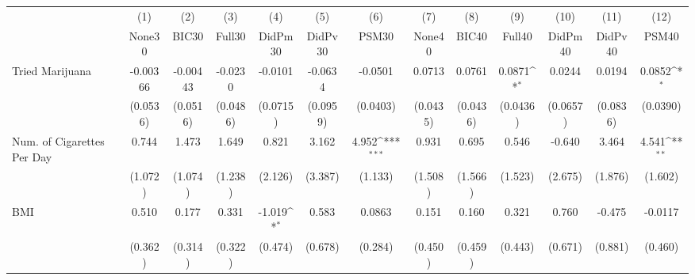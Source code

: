 {
\def\sym#1{\ifmmode^{#1}\else\(^{#1}\)\fi}
\begin{tabular}{l*{12}{c}}
\toprule
            &\multicolumn{1}{c}{(1)}&\multicolumn{1}{c}{(2)}&\multicolumn{1}{c}{(3)}&\multicolumn{1}{c}{(4)}&\multicolumn{1}{c}{(5)}&\multicolumn{1}{c}{(6)}&\multicolumn{1}{c}{(7)}&\multicolumn{1}{c}{(8)}&\multicolumn{1}{c}{(9)}&\multicolumn{1}{c}{(10)}&\multicolumn{1}{c}{(11)}&\multicolumn{1}{c}{(12)}\\
            &\multicolumn{1}{c}{None30}&\multicolumn{1}{c}{BIC30}&\multicolumn{1}{c}{Full30}&\multicolumn{1}{c}{DidPm30}&\multicolumn{1}{c}{DidPv30}&\multicolumn{1}{c}{PSM30}&\multicolumn{1}{c}{None40}&\multicolumn{1}{c}{BIC40}&\multicolumn{1}{c}{Full40}&\multicolumn{1}{c}{DidPm40}&\multicolumn{1}{c}{DidPv40}&\multicolumn{1}{c}{PSM40}\\
\midrule
Tried Marijuana&    -0.00366         &    -0.00443         &     -0.0230         &     -0.0101         &     -0.0634         &     -0.0501         &      0.0713         &      0.0761         &      0.0871\sym{*}  &      0.0244         &      0.0194         &      0.0852\sym{*}  \\
            &    (0.0536)         &    (0.0516)         &    (0.0486)         &    (0.0715)         &    (0.0959)         &    (0.0403)         &    (0.0435)         &    (0.0436)         &    (0.0436)         &    (0.0657)         &    (0.0836)         &    (0.0390)         \\
\addlinespace
Num. of Cigarettes Per Day&       0.744         &       1.473         &       1.649         &       0.821         &       3.162         &       4.952\sym{***}&       0.931         &       0.695         &       0.546         &      -0.640         &       3.464         &       4.541\sym{**} \\
            &     (1.072)         &     (1.074)         &     (1.238)         &     (2.126)         &     (3.387)         &     (1.133)         &     (1.508)         &     (1.566)         &     (1.523)         &     (2.675)         &     (1.876)         &     (1.602)         \\
\addlinespace
BMI         &       0.510         &       0.177         &       0.331         &      -1.019\sym{*}  &       0.583         &      0.0863         &       0.151         &       0.160         &       0.321         &       0.760         &      -0.475         &     -0.0117         \\
            &     (0.362)         &     (0.314)         &     (0.322)         &     (0.474)         &     (0.678)         &     (0.284)         &     (0.450)         &     (0.459)         &     (0.443)         &     (0.671)         &     (0.881)         &     (0.460)         \\

\end{tabular}}
